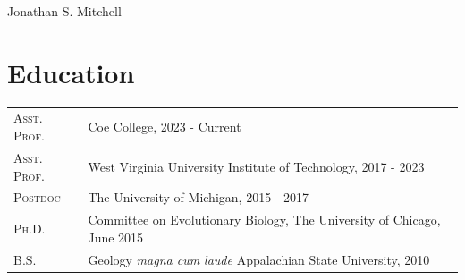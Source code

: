 \documentclass[a4paper, oneside, final]{scrartcl} %
\begin{document}
\begin{center} %


{\fontsize{30}{30}Jonathan S. Mitchell} %

\vspace{0.1cm} %


\section{Education}

\begin{tabularx}{0.97\linewidth}{>{\raggedleft\scshape}p{2cm}X}
Asst. Prof. & Coe College, 2023 - Current \\
Asst. Prof. & West Virginia University Institute of Technology, 2017 - 2023 \\
Postdoc & The University of Michigan, 2015 - 2017 \\
 Ph.D. & Committee on Evolutionary Biology, The University of Chicago, June 2015 \\
 B.S. & Geology \textit{magna cum laude} Appalachian State University, 2010 \\
\end{tabularx}



\end{center}
\end{document}
